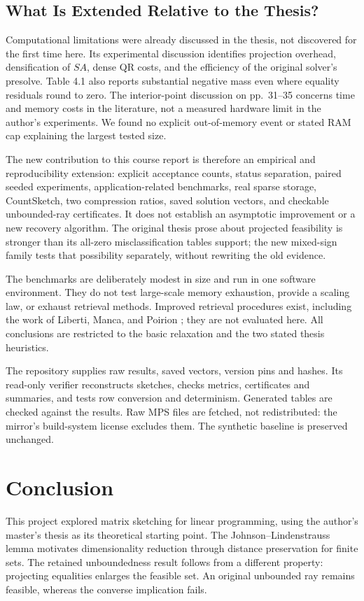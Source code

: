\documentclass[12pt,letterpaper,oneside]{report}
\theoremstyle{definition}
\begin{document}
\section{What Is Extended Relative to the Thesis?}
Computational limitations were already discussed in the thesis, not
discovered for the first time here. Its experimental discussion
\cite[pp.~38--40]{thesis2025} identifies projection overhead, densification
of $SA$, dense QR costs, and the efficiency of the original solver's
presolve. Table 4.1 also reports substantial negative mass even where
equality residuals round to zero. The interior-point discussion on
pp.~31--35 concerns time and memory costs in the literature, not a
measured hardware limit in the author's experiments. We found no explicit
out-of-memory event or stated RAM cap explaining the largest tested size.

The new contribution to this course report is therefore an empirical and
reproducibility extension: explicit acceptance counts, status separation,
paired seeded experiments, application-related benchmarks, real sparse
storage, CountSketch, two compression ratios, saved solution vectors,
and checkable unbounded-ray certificates. It does not establish an
asymptotic improvement or a new recovery algorithm. The original thesis
prose about projected feasibility is stronger than its all-zero
misclassification tables support; the new mixed-sign family tests that
possibility separately, without rewriting the old evidence.

The benchmarks are deliberately modest in size and run in one software
environment. They do not test large-scale memory exhaustion, provide a
scaling law, or exhaust retrieval methods. Improved retrieval procedures
exist, including the work of Liberti, Manca, and Poirion
\cite{liberti2023}; they are not evaluated here. All conclusions are
restricted to the basic relaxation and the two stated thesis heuristics.

The repository supplies raw results, saved vectors, version pins and hashes.
Its read-only verifier reconstructs sketches, checks metrics, certificates
and summaries, and tests row conversion and determinism. Generated tables
are checked against the results. Raw MPS files are fetched, not redistributed:
the mirror's build-system license excludes them. The synthetic baseline
is preserved unchanged.

\chapter{Conclusion}
This project explored matrix sketching for linear programming, using
the author's master's thesis as its theoretical starting point.
The Johnson--Lindenstrauss lemma motivates dimensionality reduction
through distance preservation for finite sets. The retained
unboundedness result follows from a different property: projecting
equalities enlarges the feasible set. An original unbounded ray remains
feasible, whereas the converse implication fails.
\end{document}
